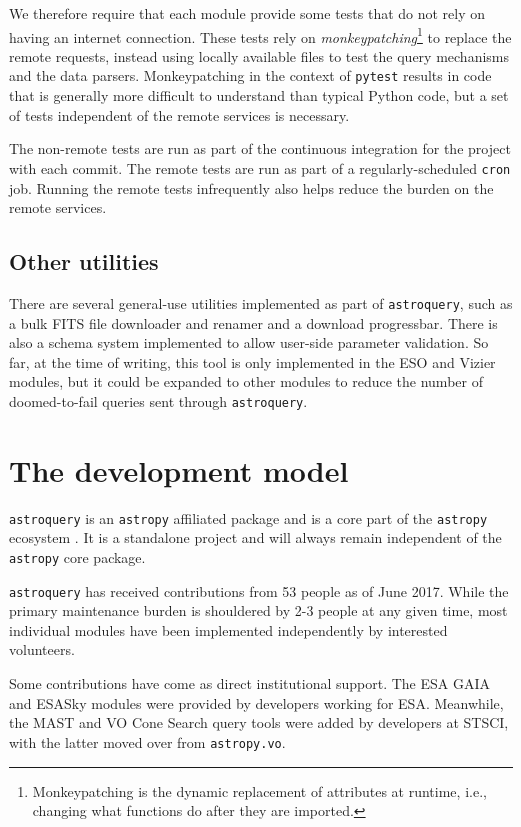 \documentclass[twocolumn]{aastex61}
\newcommand{\package}[1]{\texttt{#1}\xspace}
\newcommand{\astroquery}{\package{astroquery}}
\newcommand{\astropypkg}{\package{astropy}}
\begin{document}
We therefore require that each module provide some tests that do not rely on
having an internet connection.  These tests rely on
\emph{monkeypatching}\footnote{Monkeypatching is the dynamic replacement of
attributes at runtime, i.e., changing what functions do after they are
imported.} to
replace the remote requests, instead using locally available files to test the
query mechanisms and the data parsers.  Monkeypatching in the context of
\package{pytest} results in code that is generally more difficult to understand
than typical Python code, but a set of tests independent of the remote services
is necessary.

The non-remote tests are run as part of the continuous integration for the
project with each commit.  The remote tests are run as part of a
regularly-scheduled \texttt{cron} job.  Running the remote tests infrequently
also helps reduce the burden on the remote services.

\subsection{Other utilities}
There are several general-use utilities implemented as part of \astroquery, such
as a bulk FITS file downloader and renamer and a download progressbar.  There
is also a schema system implemented to allow user-side parameter validation.
So far, at the time of writing, this tool is only implemented in the ESO and
Vizier modules, but it could be expanded to other modules to reduce the number
of doomed-to-fail queries sent through \astroquery.

\section{The development model}
\label{sec:development}
\astroquery is an \astropypkg affiliated package and is a core part of the
\astropypkg ecosystem \citep{Astropy-Collaboration2013a}.  It is a
standalone project and will always remain independent of the \astropypkg
core package.

\astroquery has received contributions from 53 people as of June 2017.
While the primary maintenance burden is shouldered by 2-3 people at any given time,
most individual modules have been implemented independently by interested volunteers.

Some contributions have come as direct institutional support.  The ESA GAIA and
ESASky modules were provided by developers working for ESA.  Meanwhile,
the MAST and VO Cone Search query tools were added by developers at STSCI,
with the latter moved over from \texttt{astropy.vo}.
\end{document}
